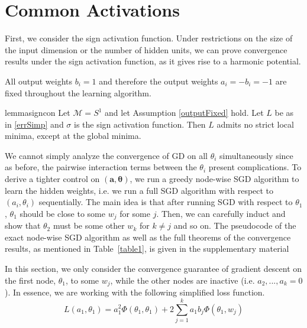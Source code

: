 \section{Common Activations}
First, we consider the sign activation function. Under restrictions on the size of the input dimension or the number of hidden units, we can prove convergence results under the sign activation function, as it gives rise to a harmonic potential.

\begin{assumption}
\label{outputFixed}
All output weights $b_i = 1$ and therefore the output weights  $a_i = - b_i = -1$ are fixed throughout the learning algorithm. 
\end{assumption}

\begin{restatable}{lemma}{signcon}\label{signCon}
Let $\mathcal{M} = S^1$ and let Assumption \ref{outputFixed} hold. Let $L$ be as in \eqref{errSimp} and $\sigma$ is the sign activation function. Then $L$ admits no strict local minima, except at the global minima.
\end{restatable}


We cannot simply analyze the convergence of GD
on all $\theta_i$ simultaneously since as before, the pairwise
interaction terms between the $\theta_i$ present complications. To
derive a tighter control on $(\boldsymbol{a,\theta})$, we run a greedy
node-wise SGD algorithm to learn the hidden weights, i.e. we run a
full SGD algorithm with respect to $(a_i,\theta_i)$ sequentially. The
main idea is that after running SGD with respect to $\theta_1$,
$\theta_1$ should be close to some $w_j$ for some $j$. Then, we can
carefully induct and show that $\theta_2$ must be some other $w_k$ for
$k\neq j$ and so on. The pseudocode of the exact node-wise SGD
algorithm as well as the full theorems of the convergence results, as
mentioned in Table~\ref{table1}, is given in the supplementary
material

In this section, we only consider the convergence guarantee of gradient descent on the first node, $\theta_1$, to some $w_j$, while the other nodes are inactive (i.e. $a_2,...,a_k = 0$). In essence, we are working with the following simplified loss function.
%
\begin{equation}\label{errLossUnit}
L(a_1,\theta_1) =  a_1^2 \Phi(\theta_1,\theta_1)  + 2\sum_{j=1}^k a_1b_j \Phi(\theta_1,w_j)
\end{equation}



